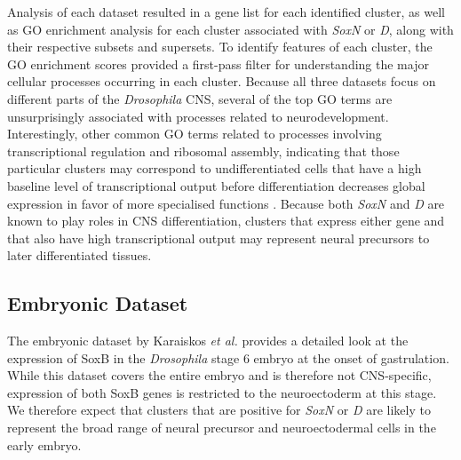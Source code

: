 \documentclass[withindex,glossary]{cam-thesis}
\begin{document}
Analysis of each dataset resulted in a gene list for each identified
cluster, as well as GO enrichment analysis for each cluster associated
with \emph{SoxN} or \emph{D}, along with their respective subsets and
supersets. To identify features of each cluster, the GO enrichment
scores provided a first-pass filter for understanding the major cellular
processes occurring in each cluster. Because all three datasets focus on
different parts of the \emph{Drosophila} CNS, several of the top GO
terms are unsurprisingly associated with processes related to
neurodevelopment. Interestingly, other common GO terms related to
processes involving transcriptional regulation and ribosomal assembly,
indicating that those particular clusters may correspond to
undifferentiated cells that have a high baseline level of
transcriptional output before differentiation decreases global
expression in favor of more specialised functions .
Because both \emph{SoxN} and \emph{D} are known to play roles in CNS
differentiation, clusters that express either gene and that also have
high transcriptional output may represent neural precursors to later
differentiated tissues.

\subsection{Embryonic Dataset}

The embryonic dataset by Karaiskos \emph{et al.} provides a detailed
look at the expression of SoxB in the \emph{Drosophila} stage 6 embryo
at the onset of gastrulation. While this dataset covers the entire
embryo and is therefore not CNS-specific, expression of both SoxB genes
is restricted to the neuroectoderm at this stage. We therefore expect
that clusters that are positive for \emph{SoxN} or \emph{D} are likely
to represent the broad range of neural precursor and neuroectodermal
cells in the early embryo.
\end{document}
